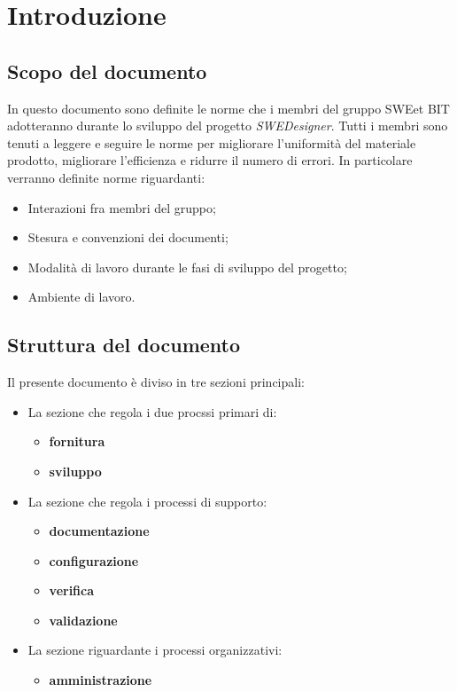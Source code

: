 \section{Introduzione}
  \subsection{Scopo del documento}
          In questo documento sono definite le norme che i membri del gruppo SWEet BIT adotteranno durante lo sviluppo del progetto \emph{SWEDesigner}.
          Tutti i membri sono tenuti a leggere e seguire le norme per migliorare l’uniformità del materiale prodotto, migliorare l’efficienza
          e ridurre il numero di errori.
          In particolare verranno definite norme riguardanti:
            \begin{itemize}
              \item Interazioni fra membri del gruppo;
              \item Stesura e convenzioni dei documenti;
              \item Modalità di lavoro durante le fasi di sviluppo del progetto;
              \item Ambiente di lavoro.
            \end{itemize}
  \subsection{Struttura del documento}
    Il presente documento è diviso in tre sezioni principali:
    \begin{itemize}
      \item La sezione che regola i due procssi primari di:
      \begin{itemize}
      \item \textbf{fornitura}
      \item \textbf{sviluppo}
      \end{itemize}
      \item La sezione che regola i processi di supporto:
      \begin{itemize}
      \item \textbf{documentazione}
      \item \textbf{configurazione}
      \item \textbf{verifica}
      \item \textbf{validazione}
      \end{itemize}
      \item La sezione riguardante i processi organizzativi:
	  \begin{itemize}
      \item \textbf{amministrazione}
      \end{itemize}
    \end{itemize}
